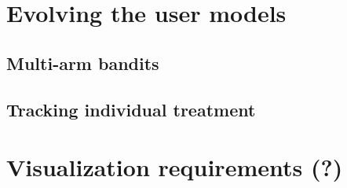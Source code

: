 
\section{Evolving the user models} %
\label{approach:sec:evolving_the_user_models}

\subsection{Multi-arm bandits}

\subsection{Tracking individual treatment}


\section{Visualization requirements (?)} %
\label{approach:sec:visualization_requirements}

